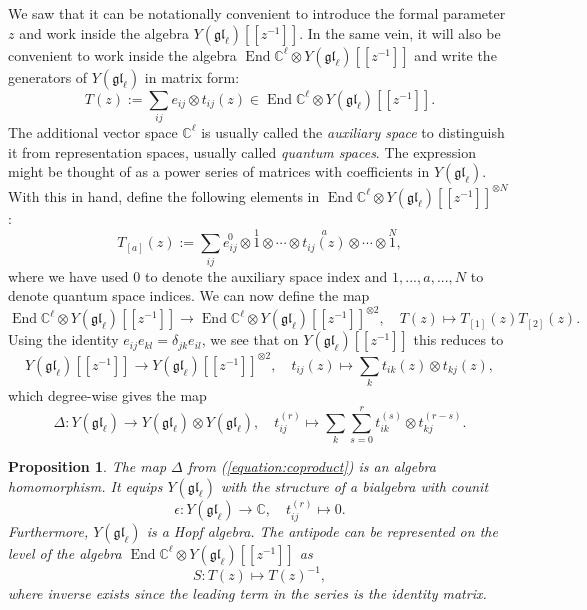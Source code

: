 \documentclass[11pt]{report}
\newtheorem{prop}[theorem]{Proposition}
\theoremstyle{definition}
\theoremstyle{remark}
\theoremstyle{remark}
\newcommand{\End}{\operatorname{End}}
\newcommand{\C}{\mathbb{C}}
\begin{document}
We saw that it can be notationally convenient to introduce the formal parameter $z$ and work inside the algebra $Y(\mathfrak{gl}_\ell)[[z^{-1}]]$. In the same vein, it will also be convenient to work inside the algebra $\End \C^\ell \otimes Y(\mathfrak{gl}_\ell)[[z^{-1}]]$ and write the generators of $Y(\mathfrak{gl}_\ell)$ in matrix form:
\begin{equation*}
T(z) := \sum_{ij} e_{ij} \otimes t_{ij}(z) \in \End \C^\ell \otimes Y(\mathfrak{gl}_\ell)[[z^{-1}]].
\end{equation*}
The additional vector space $\C^\ell$ is usually called the \emph{auxiliary space} to distinguish it from representation spaces, usually called \emph{quantum spaces}. The expression might be thought of as a power series of matrices with coefficients in $Y(\mathfrak{gl}_\ell)$. With this in hand, define the following elements in $\End \C^\ell \otimes Y(\mathfrak{gl}_\ell)[[z^{-1}]]^{\otimes N}$:
\begin{equation*}
T_{[a]}(z) := \sum_{ij} \overset{0}{e_{ij}} \otimes \overset{1}{1} \otimes \cdots \otimes \overset{a}{t_{ij}(z)} \otimes \cdots \otimes \overset{N}{1},
\end{equation*}
where we have used $0$ to denote the auxiliary space index and $1,...,a,...,N$ to denote quantum space indices. We can now define the map
\begin{equation*}
\End \C^\ell \otimes Y(\mathfrak{gl}_\ell)[[z^{-1}]] \to \End \C^\ell \otimes Y(\mathfrak{gl}_\ell)[[z^{-1}]]^{\otimes 2}, \quad T(z) \mapsto T_{[1]}(z) T_{[2]}(z).
\end{equation*}
Using the identity $e_{ij} e_{kl} = \delta_{jk} e_{il}$, we see that on $Y(\mathfrak{gl}_\ell)[[z^{-1}]]$ this reduces to
\begin{equation*}
Y(\mathfrak{gl}_\ell)[[z^{-1}]] \to Y(\mathfrak{gl}_\ell)[[z^{-1}]]^{\otimes 2}, \quad t_{ij}(z) \mapsto \sum_k t_{ik}(z) \otimes t_{kj}(z),
\end{equation*}
which degree-wise gives the map
\begin{equation}\label{equation:coproduct}
\Delta: Y(\mathfrak{gl}_\ell) \to Y(\mathfrak{gl}_\ell) \otimes Y(\mathfrak{gl}_\ell), \quad t_{ij}^{(r)} \mapsto \sum_k \sum_{s=0}^r t_{ik}^{(s)} \otimes t_{kj}^{(r-s)}.
\end{equation}

\begin{prop}
The map $\Delta$ from (\ref{equation:coproduct}) is an algebra homomorphism. It equips $Y(\mathfrak{gl}_\ell)$ with the structure of a bialgebra with counit
\begin{equation*}
\epsilon: Y(\mathfrak{gl}_\ell) \to \C, \quad t_{ij}^{(r)} \mapsto 0.
\end{equation*}
Furthermore, $Y(\mathfrak{gl}_\ell)$ is a Hopf algebra. The antipode can be represented on the level of the algebra $\End \C^\ell \otimes Y(\mathfrak{gl}_\ell)[[z^{-1}]]$ as
\begin{equation*}
S: T(z) \mapsto T(z)^{-1},
\end{equation*}
where inverse exists since the leading term in the series is the identity matrix.
\end{prop}
\end{document}
